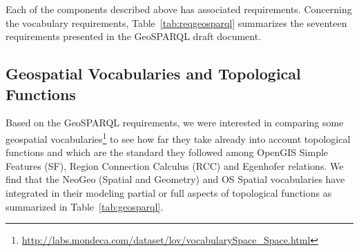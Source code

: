  Each of the components described above has associated requirements. Concerning the vocabulary requirements, Table~\ref{tab:reqgeosparql} summarizes the seventeen requirements presented in the GeoSPARQL draft document.
\begin{table}
\end{table}


\subsection{Geospatial Vocabularies and Topological Functions}
\label{sec:topofunc}

Based on the GeoSPARQL requirements, we were interested in comparing some geospatial vocabularies\footnote{\url{http://labs.mondeca.com/dataset/lov/vocabularySpace_Space.html}} to see how far they take already into account topological functions and which are the standard they followed among OpenGIS Simple Features (SF), Region Connection Calculus (RCC) and Egenhofer relations. We find that the NeoGeo (Spatial and Geometry) and OS Spatial vocabularies have integrated in their modeling partial or full aspects of topological functions as summarized in Table~\ref{tab:geosparql}.

